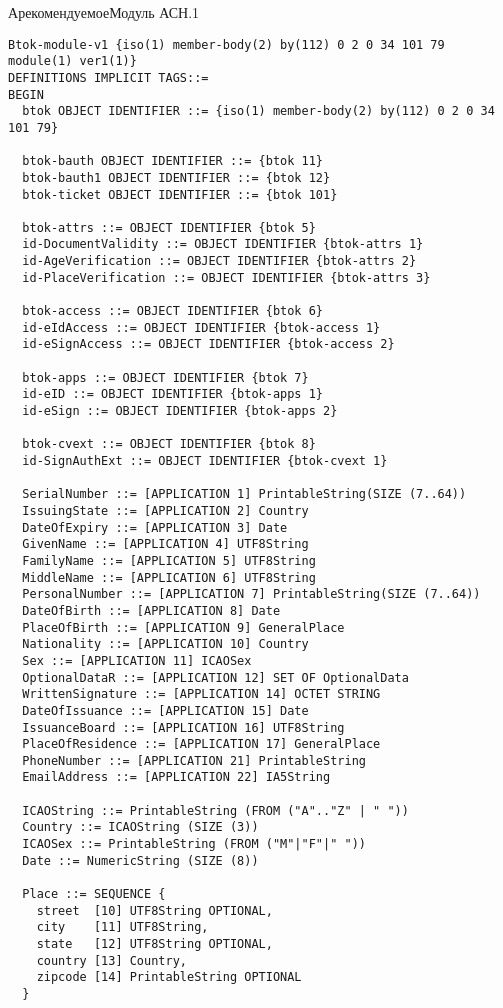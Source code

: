 \begin{appendix}{А}{рекомендуемое}{Модуль АСН.1}
\label{ASN.modul}


\begin{verbatim}
Btok-module-v1 {iso(1) member-body(2) by(112) 0 2 0 34 101 79 module(1) ver1(1)}
DEFINITIONS IMPLICIT TAGS::=
BEGIN
  btok OBJECT IDENTIFIER ::= {iso(1) member-body(2) by(112) 0 2 0 34 101 79}

  btok-bauth OBJECT IDENTIFIER ::= {btok 11}
  btok-bauth1 OBJECT IDENTIFIER ::= {btok 12}
  btok-ticket OBJECT IDENTIFIER ::= {btok 101}

  btok-attrs ::= OBJECT IDENTIFIER {btok 5}
  id-DocumentValidity ::= OBJECT IDENTIFIER {btok-attrs 1}
  id-AgeVerification ::= OBJECT IDENTIFIER {btok-attrs 2}
  id-PlaceVerification ::= OBJECT IDENTIFIER {btok-attrs 3}

  btok-access ::= OBJECT IDENTIFIER {btok 6}
  id-eIdAccess ::= OBJECT IDENTIFIER {btok-access 1}
  id-eSignAccess ::= OBJECT IDENTIFIER {btok-access 2}

  btok-apps ::= OBJECT IDENTIFIER {btok 7}
  id-eID ::= OBJECT IDENTIFIER {btok-apps 1}
  id-eSign ::= OBJECT IDENTIFIER {btok-apps 2}

  btok-cvext ::= OBJECT IDENTIFIER {btok 8}
  id-SignAuthExt ::= OBJECT IDENTIFIER {btok-cvext 1}

  SerialNumber ::= [APPLICATION 1] PrintableString(SIZE (7..64))
  IssuingState ::= [APPLICATION 2] Country
  DateOfExpiry ::= [APPLICATION 3] Date
  GivenName ::= [APPLICATION 4] UTF8String
  FamilyName ::= [APPLICATION 5] UTF8String
  MiddleName ::= [APPLICATION 6] UTF8String
  PersonalNumber ::= [APPLICATION 7] PrintableString(SIZE (7..64))
  DateOfBirth ::= [APPLICATION 8] Date
  PlaceOfBirth ::= [APPLICATION 9] GeneralPlace
  Nationality ::= [APPLICATION 10] Country
  Sex ::= [APPLICATION 11] ICAOSex
  OptionalDataR ::= [APPLICATION 12] SET OF OptionalData
  WrittenSignature ::= [APPLICATION 14] OCTET STRING
  DateOfIssuance ::= [APPLICATION 15] Date
  IssuanceBoard ::= [APPLICATION 16] UTF8String
  PlaceOfResidence ::= [APPLICATION 17] GeneralPlace
  PhoneNumber ::= [APPLICATION 21] PrintableString
  EmailAddress ::= [APPLICATION 22] IA5String
  
  ICAOString ::= PrintableString (FROM ("A".."Z" | " "))
  Country ::= ICAOString (SIZE (3))
  ICAOSex ::= PrintableString (FROM ("M"|"F"|" "))
  Date ::= NumericString (SIZE (8))
  
  Place ::= SEQUENCE {
    street  [10] UTF8String OPTIONAL,
    city    [11] UTF8String,
    state   [12] UTF8String OPTIONAL,
    country [13] Country,
    zipcode [14] PrintableString OPTIONAL
  }
  

\end{verbatim}
\end{appendix}
